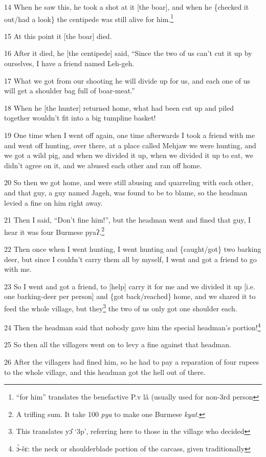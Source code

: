 14 When he saw this, he took a shot at it [the boar], and when he \{checked it
out/had a look\} the centipede was still alive for him.\footnote{``for him'' translates the benefactive P.v lâ (usually used for non-3rd person}

15 At this point it [the boar] died.

16 After it died, he [the centipede] said, ``Since the two of us can't cut it up
by ourselves, I have a friend named Leh-geh.

17 What we got from our shooting he will divide up for us, and each one of us will
get a shoulder bag full of boar-meat.''

18 When he [the hunter] returned home, what had been cut up and piled together
wouldn't fit into a big tumpline basket!

19 One time when I went off again, one time afterwards I took a friend with me
and went off hunting, over there, at a place called Mehjaw we were hunting, and
we got a wild pig, and when we divided it up, when we divided it up to eat, we
didn't agree on it, and we abused each other and ran off home.

20 So then we got home, and were still abusing and quarreling with each other,
and that guy, a guy named Jageh, was found to be to blame, so the headman levied
a fine on him right away.

21 Then I said, ``Don't fine him!'', but the headman went and fined that guy, I
hear it was four Burmese pyaʔ.\footnote{A trifling sum. It take 100 \textit{pya} to make one Burmese \textit{kyat}.}

22 Then once when I went hunting, I went hunting and \{caught/got\} two barking
deer, but since I couldn't carry them all by myself, I went and got a friend to
go with me.

23 So I went and got a friend, to [help] carry it for me and we divided it up [i.e.
one barking-deer per person] and \{got back/reached\} home, and we shared it to
feed the whole village, but they\footnote{This translates yɔ̂ `3p', referring here to those in the village who decided} the two of us only got one shoulder each.

24 Then the headman said that nobody gave him the special headman's portion!\footnote{ɔ̀-šɛ: the neck or shoulderblade portion of the carcass, given traditionally}

25 So then all the villagers went on to levy a fine against that headman.

26 After the villagers had fined him, so he had to pay a reparation of four rupees
to the whole village, and this headman got the hell out of there.

